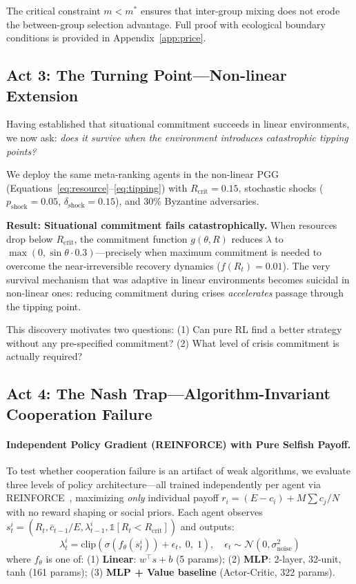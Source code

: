 \documentclass{article}
\begin{document}
\noindent The critical constraint $m < m^*$ ensures that inter-group mixing does not erode the between-group selection advantage.
Full proof with ecological boundary conditions is provided in Appendix~\ref{app:price}.

\subsection{Act 3: The Turning Point---Non-linear Extension}
\label{sec:turning_point}

Having established that situational commitment succeeds in linear environments, we now ask: \emph{does it survive when the environment introduces catastrophic tipping points?}

We deploy the same meta-ranking agents in the non-linear PGG (Equations~\ref{eq:resource}--\ref{eq:tipping}) with $R_{\text{crit}} = 0.15$, stochastic shocks ($p_{\text{shock}} = 0.05$, $\delta_{\text{shock}} = 0.15$), and 30\% Byzantine adversaries.

\textbf{Result: Situational commitment fails catastrophically.}
When resources drop below $R_{\text{crit}}$, the commitment function $g(\theta, R)$ reduces $\lambda$ to $\max(0, \sin\theta \cdot 0.3)$---precisely when maximum commitment is needed to overcome the near-irreversible recovery dynamics ($f(R_t) = 0.01$).
The very survival mechanism that was adaptive in linear environments becomes suicidal in non-linear ones: reducing commitment during crises \emph{accelerates} passage through the tipping point.

This discovery motivates two questions: (1) Can pure RL find a better strategy without any pre-specified commitment? (2) What level of crisis commitment is actually required?

\subsection{Act 4: The Nash Trap---Algorithm-Invariant Cooperation Failure}
\label{sec:nash_trap}

\paragraph{Independent Policy Gradient (REINFORCE) with Pure Selfish Payoff.}
To test whether cooperation failure is an artifact of weak algorithms, we evaluate three levels of policy architecture---all trained independently per agent via REINFORCE~\citep{williams1992simple}, maximizing \emph{only} individual payoff $r_i = (E - c_i) + M\sum c_j / N$ with no reward shaping or social priors.
Each agent observes $s_t^i = (R_t, \bar{c}_{t-1}/E, \lambda_{t-1}^i, \mathbb{1}[R_t < R_{\text{crit}}])$ and outputs:
\begin{equation}
\lambda_t^i = \text{clip}\!\left(\sigma(f_\theta(s_t^i)) + \epsilon_t,\; 0,\; 1\right), \quad \epsilon_t \sim \mathcal{N}(0, \sigma_{\text{noise}}^2)
\end{equation}
where $f_\theta$ is one of: (1) \textbf{Linear}: $w^\top s + b$ (5 params); (2) \textbf{MLP}: 2-layer, 32-unit, tanh (161 params); (3) \textbf{MLP + Value baseline} (Actor-Critic, 322 params).
\end{document}
